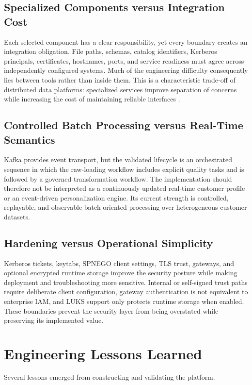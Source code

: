 \subsection{Specialized Components versus Integration Cost}
Each selected component has a clear responsibility, yet every boundary creates an integration obligation. File paths, schemas, catalog identifiers, Kerberos principals, certificates, hostnames, ports, and service readiness must agree across independently configured systems. Much of the engineering difficulty consequently lies between tools rather than inside them. This is a characteristic trade-off of distributed data platforms: specialized services improve separation of concerns while increasing the cost of maintaining reliable interfaces \cite{kleppmann2017ddia}.

\subsection{Controlled Batch Processing versus Real-Time Semantics}
Kafka provides event transport, but the validated lifecycle is an orchestrated sequence in which the raw-loading workflow includes explicit quality tasks and is followed by a governed transformation workflow. The implementation should therefore not be interpreted as a continuously updated real-time customer profile or an event-driven personalization engine. Its current strength is controlled, replayable, and observable batch-oriented processing over heterogeneous customer datasets.

\subsection{Hardening versus Operational Simplicity}
Kerberos tickets, keytabs, SPNEGO client settings, TLS trust, gateways, and optional encrypted runtime storage improve the security posture while making deployment and troubleshooting more sensitive. Internal or self-signed trust paths require deliberate client configuration, gateway authentication is not equivalent to enterprise IAM, and LUKS support only protects runtime storage when enabled. These boundaries prevent the security layer from being overstated while preserving its implemented value.

\section{Engineering Lessons Learned}
Several lessons emerged from constructing and validating the platform.

